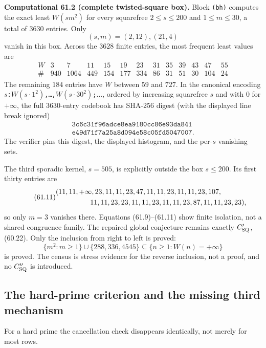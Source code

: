 \documentclass[10pt,reqno]{amsart}
\theoremstyle{definition}
\newcommand{\1}{\mathbf 1}
\begin{document}
\medskip\noindent\textbf{Computational 61.2 (complete twisted-square box).}
Block \texttt{(bh)} computes the exact least $W(sm^2)$ for every squarefree
$2\leq s\leq200$ and $1\leq m\leq30$, a total of $3630$ entries.  Only
\begin{equation}\tag{61.9}
                    (s,m)=(2,12),(21,4)
\end{equation}
vanish in this box.  Across the $3628$ finite entries, the most frequent
least values are
\begin{equation}\tag{61.10}
\begin{array}{c|rrrrrrrrrrrr}
W&3&7&11&15&19&23&31&35&39&43&47&55\\
\#&940&1064&449&154&177&334&86&31&51&30&104&24
\end{array}
\end{equation}
The remaining $184$ entries have $W$ between $59$ and $727$.  In the
canonical encoding
\texttt{$s$:$W(s\cdot1^2)$,\ldots,$W(s\cdot30^2)$;$\ldots$}, ordered by
increasing squarefree $s$ and with $0$ for $+\infty$, the full
$3630$-entry codebook has SHA-256 digest (with the displayed line break
ignored)
\[
\begin{gathered}
\texttt{3c6c31f96adce8ea9180cc86e93da841}\\
\texttt{e49d71f7a25a8d094e58c05fd5047007}.
\end{gathered}
\]
The verifier pins this digest, the displayed histogram, and the per-$s$
vanishing sets.

The third sporadic kernel, $s=505$, is explicitly outside the box
$s\leq200$.  Its first thirty entries are
\begin{equation}\tag{61.11}
\begin{split}
&(11,11,+\infty,23,11,11,23,47,11,11,23,11,11,23,107,\\
&\hspace{17mm}11,11,23,23,11,11,23,11,11,23,87,11,11,23,23),
\end{split}
\end{equation}
so only $m=3$ vanishes there.  Equations (61.9)--(61.11) show finite
isolation, not a shared congruence family.  The repaired global conjecture
remains exactly $C_{\rm SQ}'$, (60.22).  Only the inclusion from right to
left is proved:
\[
 \{m^2:m\geq1\}\cup\{288,336,4545\}
 \subseteq\{n\geq1:W(n)=+\infty\}
\]
is proved.  The census is stress evidence for the reverse inclusion, not a
proof, and no $C_{\rm SQ}''$ is introduced.

\subsection{The hard-prime criterion and the missing third mechanism}
For a hard prime the cancellation check disappears identically, not merely
for most rows.
\end{document}
